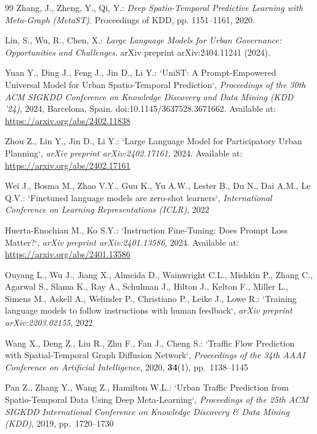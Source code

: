 \documentclass[a4paper,fleqn]{cas-sc}
\begin{document}
\begin{thebibliography}{99}
Zhang, J., Zheng, Y., Qi, Y.:
\textit{Deep Spatio-Temporal Predictive Learning with Meta-Graph (MetaST)}. 
Proceedings of KDD, pp. 1151–1161, 2020.

Lin, S., Wu, R., Chen, X.:
\textit{Large Language Models for Urban Governance: Opportunities and Challenges}. 
arXiv preprint arXiv:2404.11241 (2024).

Yuan Y., Ding J., Feng J., Jin D., Li Y.:  
`UniST: A Prompt-Empowered Universal Model for Urban Spatio-Temporal Prediction`, \textit{Proceedings of the 30th ACM SIGKDD Conference on Knowledge Discovery and Data Mining (KDD '24)}, 2024, Barcelona, Spain. doi:10.1145/3637528.3671662. Available at: \url{https://arxiv.org/abs/2402.11838}

Zhou Z., Lin Y., Jin D., Li Y.:  
`Large Language Model for Participatory Urban Planning`, \textit{arXiv preprint arXiv:2402.17161}, 2024. Available at: \url{https://arxiv.org/abs/2402.17161}

Wei J., Bosma M., Zhao V.Y., Guu K., Yu A.W., Lester B., Du N., Dai A.M., Le Q.V.:  
`Finetuned language models are zero-shot learners`, \textit{International Conference on Learning Representations (ICLR)}, 2022

Huerta-Enochian M., Ko S.Y.:  
`Instruction Fine-Tuning: Does Prompt Loss Matter?`, \textit{arXiv preprint arXiv:2401.13586}, 2024. Available at: \url{https://arxiv.org/abs/2401.13586}

Ouyang L., Wu J., Jiang X., Almeida D., Wainwright C.L., Mishkin P., Zhang C., Agarwal S., Slama K., Ray A., Schulman J., Hilton J., Kelton F., Miller L., Simens M., Askell A., Welinder P., Christiano P., Leike J., Lowe R.:  
`Training language models to follow instructions with human feedback`, \textit{arXiv preprint arXiv:2203.02155}, 2022

Wang X., Deng Z., Liu R., Zhu F., Fan J., Cheng S.:  
`Traffic Flow Prediction with Spatial-Temporal Graph Diffusion Network`, \textit{Proceedings of the 34th AAAI Conference on Artificial Intelligence}, 2020, \textbf{34}(1), pp.~1138--1145

Pan Z., Zhang Y., Wang Z., Hamilton W.L.:  
`Urban Traffic Prediction from Spatio-Temporal Data Using Deep Meta-Learning`, \textit{Proceedings of the 25th ACM SIGKDD International Conference on Knowledge Discovery \& Data Mining (KDD)}, 2019, pp.~1720--1730


\end{thebibliography}
\end{document}
